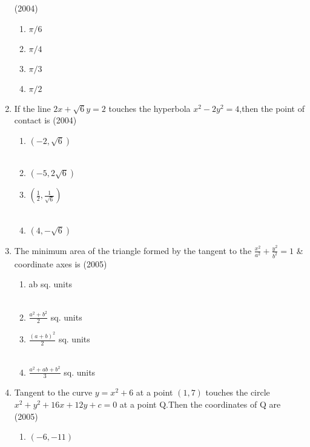 \begin{enumerate}
\hfill{(2004)}
\begin{multicols}{2}
\begin{enumerate}
    \item $\pi/6$ 
    \item $\pi/4$ 
    \item $\pi/3$
    \item $\pi/2$
\end{enumerate}
\end{multicols}
\item If the line $2x+\sqrt{6}y=2$ touches the hyperbola $x^{2}-2y^{2}=4$,then the point of contact is \hfill{(2004)}
\begin{multicols}{2}
\begin{enumerate}
    \item ${(-2,\sqrt{6})}$\\\\
    \item ${(-5,2\sqrt{6})}$
    \item ${(\frac{1}{2},\frac{1}{\sqrt{6}})}$\\\\
    \item ${(4,-\sqrt{6})}$
\end{enumerate}
\end{multicols}
\item The minimum area of the triangle formed by the tangent to the $\frac{x^{2}}{a^{2}}+\frac{y^{2}}{b^{2}}=1$ \& coordinate axes is \hfill{(2005)}
\begin{multicols}{2}
\begin{enumerate}
    \item ab sq. units\\\\
    \item $\frac{a^{2}+b^{2}}{2}$ sq. units
    \item $\frac{(a+b)^{2}}{2}$ sq. units\\\\
    \item $\frac{a^{2}+ab+b^{2}}{3}$ sq. units
\end{enumerate}
\end{multicols}
\item Tangent to the curve $y=x^{2}+6$ at a point ${(1,7)}$ touches the circle $x^{2}+y^{2}+16x+12y+c=0$ at a point Q.Then the coordinates of Q are \hfill{(2005)}
\begin{multicols}{2}
\begin{enumerate}
    \item${(-6,-11)}$\\\\

\end{enumerate}
\end{multicols}
\end{enumerate}
